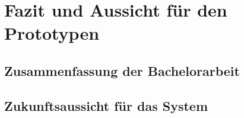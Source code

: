 \chapter{Fazit und Aussicht für den Prototypen}

\section{Zusammenfassung der Bachelorarbeit}
\section{Zukunftsaussicht für das System}